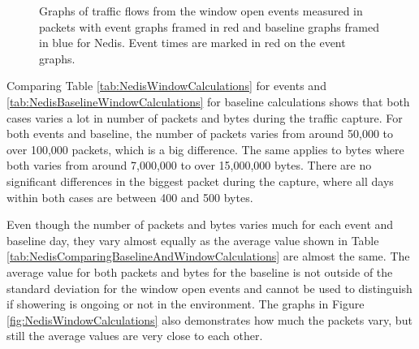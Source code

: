 \begin{figure}[H]
\begin{subfigure}[b]{0.47\textwidth}
        \centering
    \end{subfigure}
        \begin{subfigure}[b]{0.47\textwidth}
        \centering
    \end{subfigure}
    \begin{subfigure}[b]{0.47\textwidth}
        \centering
    \end{subfigure}
    \begin{subfigure}[b]{0.47\textwidth}
        \centering
    \end{subfigure}
    \hspace{0.6cm}
    \begin{subfigure}[b]{0.47\textwidth}
    \centering
        \end{subfigure}
    \caption{Graphs of traffic flows from the window open events measured in packets with event graphs framed in red and baseline graphs framed in blue for Nedis. Event times are marked in red on the event graphs.}  
    \label{fig:NedisWindowBytes2}
\end{figure}

Comparing Table \ref{tab:NedisWindowCalculations} for events and \ref{tab:NedisBaselineWindowCalculations} for baseline calculations shows that both cases varies a lot in number of packets and bytes during the traffic capture. For both events and baseline, the number of packets varies from around 50,000 to over 100,000 packets, which is a big difference. The same applies to bytes where both varies from around 7,000,000 to over 15,000,000 bytes. There are no significant differences in the biggest packet during the capture, where all days within both cases are between 400 and 500 bytes. 

Even though the number of packets and bytes varies much for each event and baseline day, they vary almost equally as the average value shown in Table \ref{tab:NedisComparingBaselineAndWindowCalculations} are almost the same. The average value for both packets and bytes for the baseline is not outside of the standard deviation for the window open events and cannot be used to distinguish if showering is ongoing or not in the environment. The graphs in Figure \ref{fig:NedisWindowCalculations} also demonstrates how much the packets vary, but still the average values are very close to each other.

